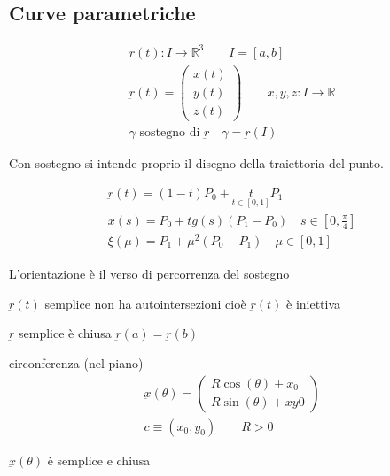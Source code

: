 \documentclass[a4paper, oneside]{article}
\begin{document}
\subsection{Curve parametriche}
\begin{definition}
    \begin{gather*}
        \underbar{r}(t) : I \to \mathbb{R}^3 \qquad I = [a,b]\\
        \underbar{r}(t) = \begin{pmatrix}
            x(t)\\ y(t) \\ z(t)
        \end{pmatrix}
        \qquad x,y,z : I \to \mathbb{R}\\
        \gamma \text{ sostegno di } \underbar{r} \quad \gamma = \underbar{r}(I)
    \end{gather*}
\end{definition}
\noindent
Con sostegno si intende proprio il disegno della traiettoria del punto.
\begin{example}
    \begin{gather*}
        \underbar{r}(t) = (1-t)P_0 + \underset{t \in [0,1]}{t} P_1\\
        \underbar{x}(s) = P_0 + tg(s)(P_1-P_0) \quad s \in [0,\frac{\pi}{4}]\\
        \underline{\xi}(\mu) = P_1 + \mu^2(P_0-P_1) \quad \mu \in [0,1]
    \end{gather*}
\end{example}
\begin{definition}
    L'orientazione è il verso di percorrenza del sostegno
\end{definition}
\begin{definition}
    $\underbar{r}(t)$ semplice  non ha autointersezioni cioè $\underbar{r}(t)$ è iniettiva
\end{definition}
\begin{definition}
    $\underbar{r}$ semplice è chiusa  $\underbar{r}(a) = \underbar{r}(b)$
\end{definition}
\begin{example}
    circonferenza (nel piano)
    \begin{gather*}
        \underbar{x}(\theta) = 
        \begin{pmatrix}
            R \cos(\theta) + x_0\\
            R \sin(\theta) + xy0
        \end{pmatrix}\\
        c \equiv (x_0,y_0) \qquad R>0
    \end{gather*}
    \begin{center}
    \end{center}
    $\underbar{x}(\theta)$ è semplice e chiusa
\end{example}
\end{document}

